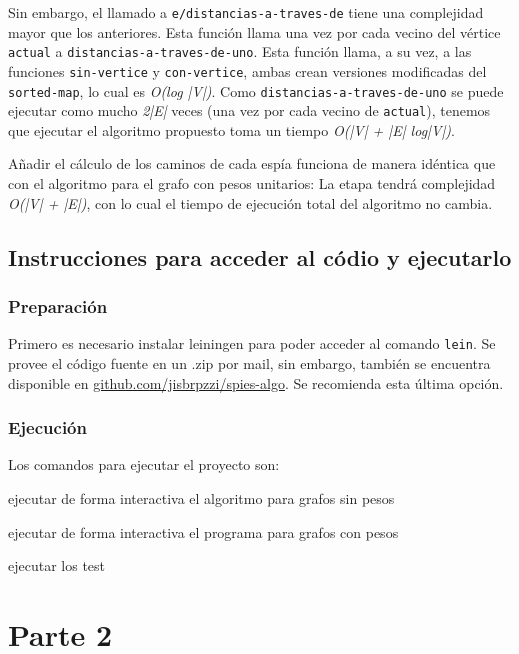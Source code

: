 \documentclass{article}
\begin{document}
Sin embargo, el llamado a \texttt{e/distancias-a-traves-de} tiene una complejidad mayor que los anteriores. Esta función llama una vez por cada vecino del vértice \texttt{actual} a \texttt{distancias-a-traves-de-uno}. Esta función llama, a su vez, a las funciones \texttt{sin-vertice} y \texttt{con-vertice}, ambas crean versiones modificadas del \texttt{sorted-map}, lo cual es \textit{O(log |V|)}. Como \texttt{distancias-a-traves-de-uno} se puede ejecutar como mucho \textit{2|E|} veces (una vez por cada vecino de \texttt{actual}), tenemos que ejecutar el algoritmo propuesto toma un tiempo \textit{O(|V| + |E| log|V|)}.

Añadir el cálculo de los caminos de cada espía funciona de manera idéntica que con el algoritmo para el grafo con pesos unitarios: La etapa tendrá complejidad \textit{O(|V| + |E|)}, con lo cual el tiempo de ejecución total del algoritmo no cambia.

\subsection{Instrucciones para acceder al códio y ejecutarlo}

\subsubsection{Preparación}
Primero es necesario instalar leiningen para poder acceder al comando \texttt{lein}. Se provee el código fuente en un .zip por mail, sin embargo, también se encuentra disponible en \href{http://github.com/jisbruzzi/spies-algo}{github.com/jisbrpzzi/spies-algo}. Se recomienda esta última opción.

\subsubsection{Ejecución}
Los comandos para ejecutar el proyecto son:

\begin{itemsize}

\item {} ejecutar de forma interactiva el algoritmo para grafos sin pesos
\item {} ejecutar de forma interactiva el programa para grafos con pesos
\item {} ejecutar los test

\end{itemsize}

\newpage
\section{Parte 2}
\end{document}

